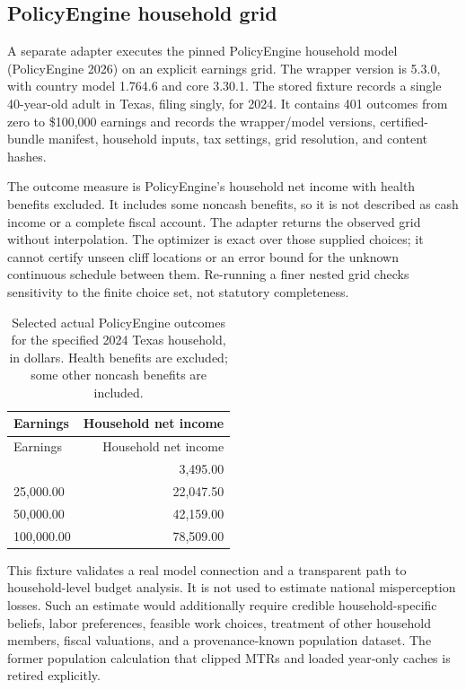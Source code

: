 \documentclass[
  11pt,
  letterpaper,
  DIV=11,
  numbers=noendperiod]{scrartcl}
\begin{document}
\subsection{PolicyEngine household
grid}\label{policyengine-household-grid}

A separate adapter executes the pinned PolicyEngine household model
(PolicyEngine 2026) on an explicit earnings grid. The wrapper version is
5.3.0, with country model 1.764.6 and core 3.30.1. The stored fixture
records a single 40-year-old adult in Texas, filing singly, for 2024. It
contains 401 outcomes from zero to \$100,000 earnings and records the
wrapper/model versions, certified-bundle manifest, household inputs, tax
settings, grid resolution, and content hashes.

The outcome measure is PolicyEngine's household net income with health
benefits excluded. It includes some noncash benefits, so it is not
described as cash income or a complete fiscal account. The adapter
returns the observed grid without interpolation. The optimizer is exact
over those supplied choices; it cannot certify unseen cliff locations or
an error bound for the unknown continuous schedule between them.
Re-running a finer nested grid checks sensitivity to the finite choice
set, not statutory completeness.

\begin{longtable}[]{@{}lr@{}}
\caption{Selected actual PolicyEngine outcomes for the specified 2024
Texas household, in dollars. Health benefits are excluded; some other
noncash benefits are included.}\label{tbl-household}\tabularnewline
\toprule\noalign{}
Earnings & Household net income \\
\midrule\noalign{}
\endfirsthead
\toprule\noalign{}
Earnings & Household net income \\
\midrule\noalign{}
\endhead
\bottomrule\noalign{}
\endlastfoot
0.00 & 3,495.00 \\
25,000.00 & 22,047.50 \\
50,000.00 & 42,159.00 \\
100,000.00 & 78,509.00 \\
\end{longtable}

This fixture validates a real model connection and a transparent path to
household-level budget analysis. It is not used to estimate national
misperception losses. Such an estimate would additionally require
credible household-specific beliefs, labor preferences, feasible work
choices, treatment of other household members, fiscal valuations, and a
provenance-known population dataset. The former population calculation
that clipped MTRs and loaded year-only caches is retired explicitly.
\end{document}
